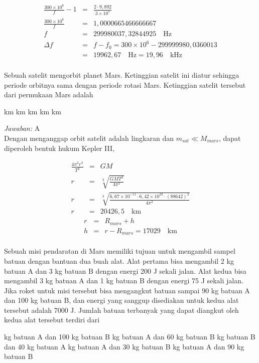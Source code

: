 \documentclass[11pt,fleqn]{exam}
\begin{document}
\begin{questions}
\begin{eqnarray*}
\frac{300 \times 10^6}{f} - 1 &=& \frac{2 \cdot 9,892}{3 \times 10^{5}}\\
\frac{300 \times 10^6}{f} &=& 1,0000665466666667\\
f &=& 299980037,32844925 \quad \text{Hz}\\
\Delta f &=& f - f_0 = 300 \times 10^6 - 299999980,0360013 \\
&=& 19962,67 \quad \text{Hz} = 19,96 \quad \text{kHz}\\
\end{eqnarray*}


\question Sebuah satelit mengorbit planet Mars. Ketinggian satelit ini diatur sehingga periode orbitnya sama dengan periode rotasi Mars. Ketinggian satelit tersebut dari permukaan Mars adalah
\begin{choices}
 km
 km
 km
 km
 km
\end{choices}

\textit{Jawaban: } A\\

Dengan menganggap orbit satelit adalah lingkaran dan $m_{sat} \ll M_{mars}$, dapat diperoleh bentuk hukum Kepler III,

\begin{eqnarray*}
\frac{4 \pi^2 r^3}{T^2} &=& GM\\
r &=& \sqrt[3]{\frac{GM T^2}{4 \pi^2}}\\
r &=& \sqrt[3]{\frac{6,67 \times 10^{-11} \cdot 6,42 \times 10^{23} \cdot (88642)^2}{4 \pi^2}}\\
r &=& 20426,5\quad \text{km}
\end{eqnarray*}
\begin{eqnarray*}
r &=& R_{mars} + h\\
h &=& r - R_{mars} = 17029 \quad \text{km} \\
\end{eqnarray*}


\question Sebuah misi pendaratan di Mars memiliki tujuan untuk mengambil sampel batuan dengan bantuan dua buah alat. Alat pertama bisa mengambil 2 kg batuan A dan 3 kg batuan B dengan energi 200 J sekali jalan. Alat kedua bisa mengambil 3 kg batuan A dan 1 kg batuan B dengan energi 75 J sekali jalan. Jika roket untuk misi tersebut bisa mengangkut batuan sampai 90 kg batuan A dan 100 kg batuan B, dan energi yang sanggup disediakan untuk kedua alat tersebut adalah 7000 J. Jumlah batuan terbanyak yang dapat diangkut oleh kedua alat tersebut terdiri dari
\begin{choices}
 kg batuan A dan 100 kg batuan B
 kg batuan A dan 60 kg batuan B
 kg batuan B dan 40 kg batuan A
 kg batuan A dan 30 kg batuan B
 kg batuan A dan 90 kg batuan B
\end{choices}


\end{questions}
\end{document}

